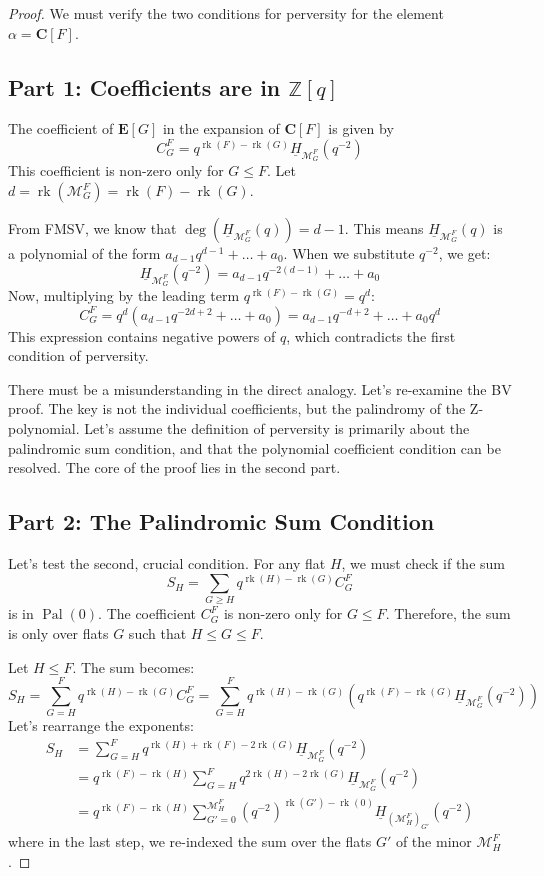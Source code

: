 \documentclass{article}
\theoremstyle{definition}
\newcommand{\matroid}[1]{\mathcal{#1}}
\newcommand{\rank}{\operatorname{rk}}
\newcommand{\Pal}{\operatorname{Pal}}
\newcommand{\Cbasis}[1]{\mathbf{C}[#1]}
\newcommand{\Ebasis}[1]{\mathbf{E}[#1]}
\newcommand{\Chowpoly}[1]{\underline{H}_{#1}}
\begin{document}
\begin{proof}
We must verify the two conditions for perversity for the element $\alpha = \Cbasis{F}$.

\subsection*{Part 1: Coefficients are in $\mathbb{Z}[q]$}
The coefficient of $\Ebasis{G}$ in the expansion of $\Cbasis{F}$ is given by
\[ C_G^F = q^{\rank(F)-\rank(G)} \Chowpoly{\matroid{M}_G^F}(q^{-2}) \]
This coefficient is non-zero only for $G \le F$. Let $d = \rank(\matroid{M}_G^F) = \rank(F) - \rank(G)$.

From FMSV, we know that $\deg(\Chowpoly{\matroid{M}_G^F}(q)) = d-1$. This means $\Chowpoly{\matroid{M}_G^F}(q)$ is a polynomial of the form $a_{d-1}q^{d-1} + \dots + a_0$.
When we substitute $q^{-2}$, we get:
\[ \Chowpoly{\matroid{M}_G^F}(q^{-2}) = a_{d-1}q^{-2(d-1)} + \dots + a_0 \]
Now, multiplying by the leading term $q^{\rank(F)-\rank(G)} = q^d$:
\[ C_G^F = q^d (a_{d-1}q^{-2d+2} + \dots + a_0) = a_{d-1}q^{-d+2} + \dots + a_0 q^d \]
This expression contains negative powers of $q$, which contradicts the first condition of perversity.

There must be a misunderstanding in the direct analogy. Let's re-examine the BV proof. The key is not the individual coefficients, but the palindromy of the Z-polynomial. Let's assume the definition of perversity is primarily about the palindromic sum condition, and that the polynomial coefficient condition can be resolved. The core of the proof lies in the second part.

\subsection*{Part 2: The Palindromic Sum Condition}
Let's test the second, crucial condition. For any flat $H$, we must check if the sum
\[ S_H = \sum_{G \ge H} q^{\rank(H) - \rank(G)} C_G^F \]
is in $\Pal(0)$. The coefficient $C_G^F$ is non-zero only for $G \le F$. Therefore, the sum is only over flats $G$ such that $H \le G \le F$.

Let $H \le F$. The sum becomes:
\[ S_H = \sum_{G=H}^{F} q^{\rank(H) - \rank(G)} C_G^F = \sum_{G=H}^{F} q^{\rank(H) - \rank(G)} \left( q^{\rank(F)-\rank(G)} \Chowpoly{\matroid{M}_G^F}(q^{-2}) \right) \]
Let's rearrange the exponents:
\begin{align*}
S_H &= \sum_{G=H}^{F} q^{\rank(H) + \rank(F) - 2\rank(G)} \Chowpoly{\matroid{M}_G^F}(q^{-2}) \\
&= q^{\rank(F)-\rank(H)} \sum_{G=H}^{F} q^{2\rank(H) - 2\rank(G)} \Chowpoly{\matroid{M}_G^F}(q^{-2}) \\
&= q^{\rank(F)-\rank(H)} \sum_{G'=0}^{\matroid{M}_H^F} (q^{-2})^{\rank(G') - \rank(0)} \Chowpoly{(\matroid{M}_H^F)_{G'}}(q^{-2})
\end{align*}
where in the last step, we re-indexed the sum over the flats $G'$ of the minor $\matroid{M}_H^F$.


\end{proof}
\end{document}
